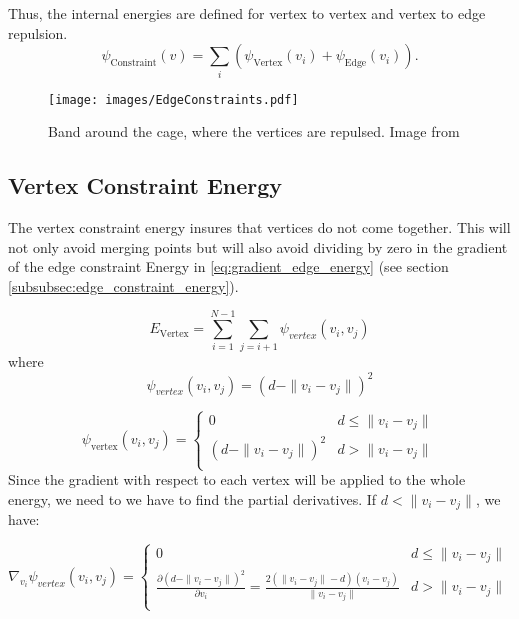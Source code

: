 Thus, the internal energies are defined for vertex to vertex and vertex to edge repulsion.
\begin{equation}
\psi_{\mathrm{Constraint}}(v) = \sum_{i} \left( \psi_{\mathrm{Vertex}}(v_i) +\psi_{\mathrm{Edge}}(v_i) \right).
\label{equ:E_constraint}
\end{equation}

\begin{figure}[h]
	\centering
	{\texttt{[image: images/EdgeConstraints.pdf]}}
	\caption{Band around the cage, where the vertices are repulsed. Image from\cite{ipcac2015}}
	\label{fig:internal_energies}
\end{figure}

\subsection*{Vertex Constraint Energy}
\label{subsubsec:vertex_constraint_energy}
The vertex constraint energy insures that vertices do not come together. This will not only avoid merging points but will also avoid dividing by zero in the gradient of the edge constraint Energy in \eqref{eq:gradient_edge_energy} (see section \ref{subsubsec:edge_constraint_energy}).

\begin{equation}
E_{\mathrm{Vertex}} = \sum\limits_{i=1}^{N-1}\sum\limits_{j=i+1} \psi_{vertex}(v_i, v_j)
\end{equation}
where
\begin{equation}
	\psi_{vertex}(v_i, v_j)=(d-\|v_i - v_j\|)^2 
\end{equation}

\begin{equation}
\psi_{\mathrm{vertex}}(v_i, v_j)= 
\begin{cases} 
0 & d\leq\|v_i - v_j\|  \\
(d-\|v_i - v_j\|)^2 & d>\|v_i - v_j\| \\
\end{cases}
\end{equation}
Since the gradient with respect to each vertex will be applied to the whole energy, we need to we have to find the partial derivatives. If $d<\|v_i-v_j\|$, we have:

\begin{equation}\label{eq:gradient_edge_energy}
\nabla_{v_i} \psi_{vertex}(v_i, v_j)= 
\begin{cases} 
0 & d\leq\|v_i - v_j\|  \\
\frac{\partial (d-\|v_i-v_j\|)^2}{\partial v_i} = \frac{2(\|v_i - v_j\|-d)(v_i-v_j)}{\|v_i - v_j\|} & d>\|v_i - v_j\| \\
\end{cases}
\end{equation}

